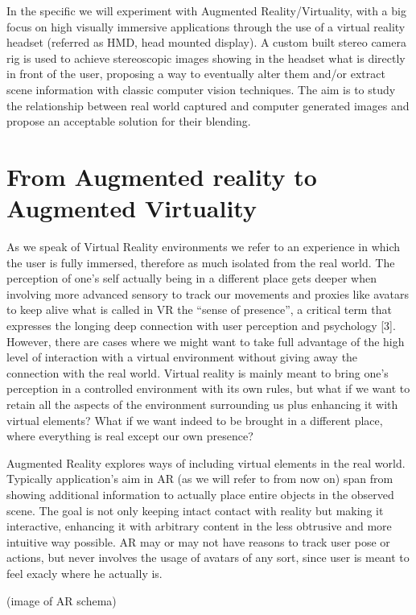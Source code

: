 In the specific we will experiment with Augmented Reality/Virtuality, with a big focus on high visually immersive applications through the use of a virtual reality headset (referred as HMD, head mounted display). A custom built stereo camera rig is used to achieve stereoscopic images showing in the headset what is directly in front of the user, proposing a way to eventually alter them and/or extract scene information with classic computer vision techniques. The aim is to study the relationship between real world captured and computer generated images and propose an acceptable solution for their blending.

\section{From Augmented reality to Augmented Virtuality}

As we speak of Virtual Reality environments we refer to an experience in which the user is fully immersed, therefore as much isolated from the real world. The perception of one’s self actually being in a different place gets deeper when involving more advanced sensory to track our movements and proxies like avatars to keep alive what is called in VR the “sense of presence”, a critical term that expresses the longing deep connection with user perception and psychology [3]. However, there are cases where we might want to take full advantage of the high level of interaction with a virtual environment without giving away the connection with the real world. Virtual reality is mainly meant to bring one’s perception in a controlled environment with its own rules, but what if we want to retain all the aspects of the environment surrounding us plus enhancing it with virtual elements? What if we want indeed to be brought in a different place, where everything is real except our own presence?

Augmented Reality explores ways of including virtual elements in the real world. Typically application’s aim in AR (as we will refer to from now on) span from showing additional information to actually place entire objects in the observed scene. The goal is not only keeping intact contact with reality but making it interactive, enhancing it with arbitrary content in the less obtrusive and more intuitive way possible. AR may or may not have reasons to track user pose or actions, but never involves the usage of avatars of any sort, since user is meant to feel exacly where he actually is.

(image of AR schema)

